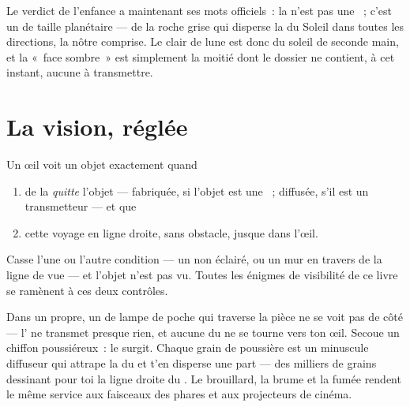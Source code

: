 \begin{example}\label{ex:g7:light-sources-propagation:moon}
Le verdict de l'enfance a maintenant ses mots officiels~: la 
n'est pas une ~; c'est un  de taille
planétaire --- de la roche grise qui disperse la  du Soleil
dans toutes les directions, la nôtre comprise. Le clair de lune est
donc du soleil de seconde main, et la «~face sombre~» est simplement
la moitié dont le dossier ne contient, à cet instant, aucune 
à transmettre.
\end{example}

\section{La vision, réglée}

\begin{proposition}\label{prop:g7:light-sources-propagation:vision}
Un œil voit un objet exactement quand
\begin{enumerate}
  \item de la  \emph{quitte} l'objet --- fabriquée, si
        l'objet est une ~; diffusée, s'il est un
        transmetteur --- et que
  \item cette  voyage en ligne droite, sans obstacle, jusque
        dans l'œil.
\end{enumerate}
Casse l'une ou l'autre condition --- un  non éclairé,
ou un mur en travers de la ligne de vue --- et l'objet n'est pas vu.
Toutes les énigmes de visibilité de ce livre se ramènent à ces deux
contrôles.
\end{proposition}

\begin{example}\label{ex:g7:light-sources-propagation:beam}
Dans un  propre, un  de lampe de poche qui traverse la
pièce ne se voit pas de côté --- l' ne transmet presque rien, et
aucune  du  ne se tourne vers ton œil. Secoue un
chiffon poussiéreux~: le  surgit. Chaque grain de poussière
est un minuscule diffuseur qui attrape la  du  et t'en
disperse une part --- des milliers de grains dessinant pour toi la
ligne droite du . Le brouillard, la brume et la fumée rendent
le même service aux faisceaux des phares et aux projecteurs de
cinéma.
\end{example}

